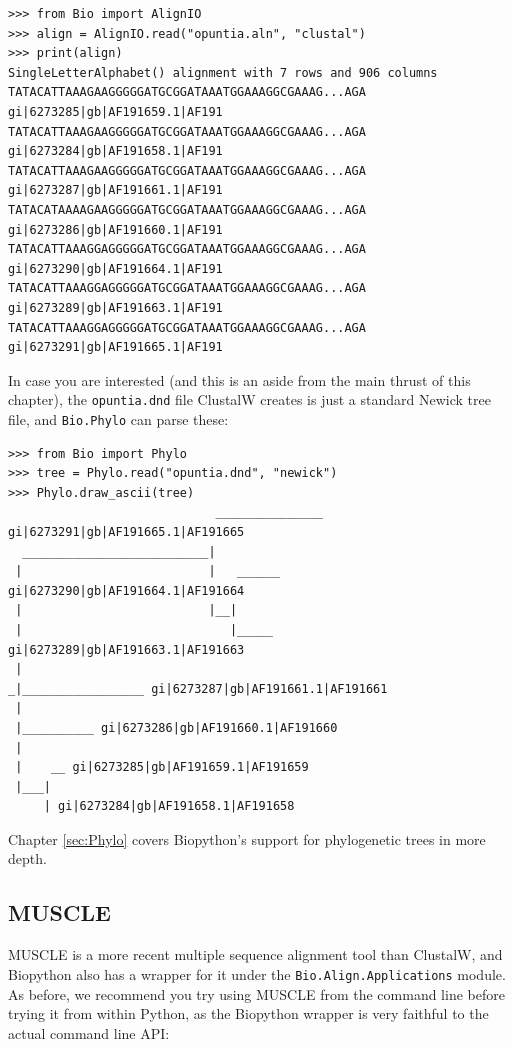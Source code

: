 \documentclass{report}
\begin{document}
\begin{verbatim}
>>> from Bio import AlignIO
>>> align = AlignIO.read("opuntia.aln", "clustal")
>>> print(align)
SingleLetterAlphabet() alignment with 7 rows and 906 columns
TATACATTAAAGAAGGGGGATGCGGATAAATGGAAAGGCGAAAG...AGA gi|6273285|gb|AF191659.1|AF191
TATACATTAAAGAAGGGGGATGCGGATAAATGGAAAGGCGAAAG...AGA gi|6273284|gb|AF191658.1|AF191
TATACATTAAAGAAGGGGGATGCGGATAAATGGAAAGGCGAAAG...AGA gi|6273287|gb|AF191661.1|AF191
TATACATAAAAGAAGGGGGATGCGGATAAATGGAAAGGCGAAAG...AGA gi|6273286|gb|AF191660.1|AF191
TATACATTAAAGGAGGGGGATGCGGATAAATGGAAAGGCGAAAG...AGA gi|6273290|gb|AF191664.1|AF191
TATACATTAAAGGAGGGGGATGCGGATAAATGGAAAGGCGAAAG...AGA gi|6273289|gb|AF191663.1|AF191
TATACATTAAAGGAGGGGGATGCGGATAAATGGAAAGGCGAAAG...AGA gi|6273291|gb|AF191665.1|AF191
\end{verbatim}

In case you are interested (and this is an aside from the main thrust of this
chapter), the \texttt{opuntia.dnd} file ClustalW creates is just a standard
Newick tree file, and \verb|Bio.Phylo| can parse these:

\begin{verbatim}
>>> from Bio import Phylo
>>> tree = Phylo.read("opuntia.dnd", "newick")
>>> Phylo.draw_ascii(tree)
                             _______________ gi|6273291|gb|AF191665.1|AF191665
  __________________________|
 |                          |   ______ gi|6273290|gb|AF191664.1|AF191664
 |                          |__|
 |                             |_____ gi|6273289|gb|AF191663.1|AF191663
 |
_|_________________ gi|6273287|gb|AF191661.1|AF191661
 |
 |__________ gi|6273286|gb|AF191660.1|AF191660
 |
 |    __ gi|6273285|gb|AF191659.1|AF191659
 |___|
     | gi|6273284|gb|AF191658.1|AF191658

\end{verbatim}

\noindent Chapter \ref{sec:Phylo} covers Biopython's support for phylogenetic trees in more
depth.

\subsection{MUSCLE}
MUSCLE is a more recent multiple sequence alignment tool than ClustalW, and
Biopython also has a wrapper for it under the \verb|Bio.Align.Applications|
module. As before, we recommend you try using MUSCLE from the command line before
trying it from within Python, as the Biopython wrapper is very faithful to the
actual command line API:
\end{document}
